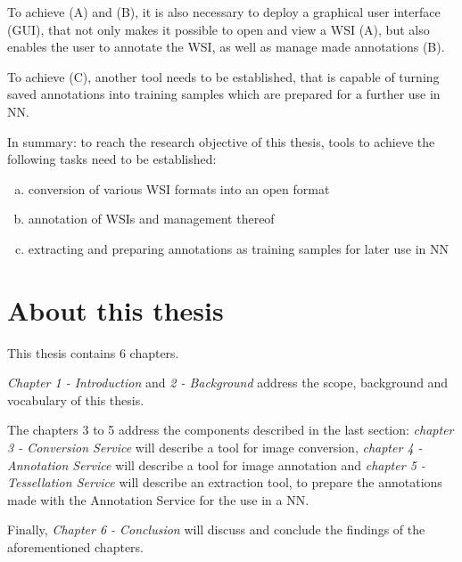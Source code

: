 To achieve (A) and (B), it is also necessary to deploy a graphical user interface (GUI), that not only makes it possible to open and view a WSI (A), but also enables the user to annotate the WSI, as well as manage made annotations (B).

To achieve (C), another tool needs to be established, that is capable of turning saved annotations into training samples which are prepared for a further use in NN.

In summary: to reach the research objective of this thesis, tools to achieve the following tasks need to be established:
\begin{enumerate}[(a)]
	\item conversion of various WSI formats into an open format
	\item annotation of WSIs and management thereof
	\item extracting and preparing annotations as training samples for later use in NN
\end{enumerate}

\section{About this thesis}
This thesis contains 6 chapters.

\emph{Chapter 1 - Introduction} and \emph{2 - Background} address the scope, background and vocabulary of this thesis.

The chapters 3 to 5 address the components described in the last section: \emph{chapter 3 - Conversion Service} will describe a tool for image conversion, \emph{chapter 4 - Annotation Service} will describe a tool for image annotation and \emph{chapter 5 - Tessellation Service} will describe an extraction tool, to prepare the annotations made with the Annotation Service for the use in a NN.

Finally, \emph{Chapter 6 - Conclusion} will discuss and conclude the findings of the aforementioned chapters.